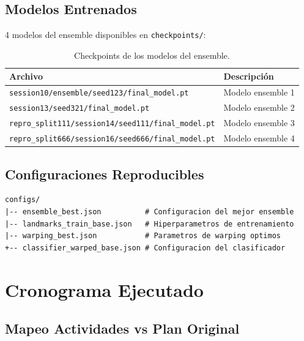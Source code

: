 \documentclass[12pt,a4paper]{article}
\newcommand{\code}[1]{\texttt{#1}}
\begin{document}
\subsection{Modelos Entrenados}

4 modelos del ensemble disponibles en \code{checkpoints/}:

\begin{table}[H]
\centering
\small
\begin{tabular}{p{10.5cm}l}
\toprule
\textbf{Archivo} & \textbf{Descripción} \\
\midrule
\code{session10/ensemble/seed123/final\_model.pt} & Modelo ensemble 1 \\
\code{session13/seed321/final\_model.pt} & Modelo ensemble 2 \\
\code{repro\_split111/session14/seed111/final\_model.pt} & Modelo ensemble 3 \\
\code{repro\_split666/session16/seed666/final\_model.pt} & Modelo ensemble 4 \\
\bottomrule
\end{tabular}
\caption{Checkpoints de los modelos del ensemble.}
\end{table}

\subsection{Configuraciones Reproducibles}

\begin{lstlisting}[style=bashstyle,numbers=none]
configs/
|-- ensemble_best.json          # Configuracion del mejor ensemble
|-- landmarks_train_base.json   # Hiperparametros de entrenamiento
|-- warping_best.json           # Parametros de warping optimos
+-- classifier_warped_base.json # Configuracion del clasificador
\end{lstlisting}

\section{Cronograma Ejecutado}

\subsection{Mapeo Actividades vs Plan Original}
\end{document}
